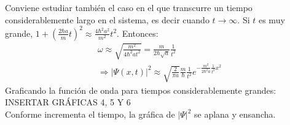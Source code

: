Conviene estudiar también el caso en el que transcurre un tiempo considerablemente largo en el sistema, es decir cuando 
$t\rightarrow\infty$. Si $t$ es muy grande, $1+\left (\frac{2\hbar a}{m}t \right )^2 \approx \frac{4\hbar^2a^2}{m^2}t^2$. 
Entonces:
\begin{gather*}
    \omega \approx \sqrt{\frac{m^2}{4\hbar^2at^2}} = \frac{m}{2\hbar\sqrt{a}} \frac{1}{t^2} \\
    \Rightarrow \lvert\Psi(x,t)\rvert^2 \approx \sqrt{\frac{2}{\pi a}} \frac{m}{\hbar} \frac{1}{t^2} e^{-\frac{m^2}{2\hbar^2a} \frac{1}{t^2} x^2}
\end{gather*}
Graficando la función de onda para tiempos considerablemente grandes:\\

INSERTAR GRÁFICAS 4, 5 Y 6 \\

Conforme incrementa el tiempo, la gráfica de $\lvert\Psi\rvert^2$ se aplana y ensancha.